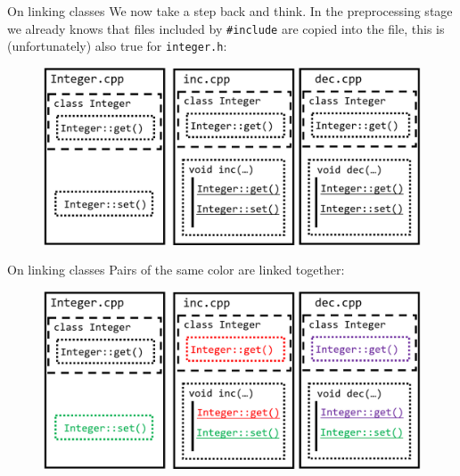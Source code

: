 \begin{frame}{On linking classes}
We now take a step back and think. In the preprocessing stage we already knows that files included by \texttt{\#include} are copied into the file, this is (unfortunately) also true for \texttt{integer.h}:

\vspace{-0.1in}
\begin{figure}
\centering
\includegraphics[scale=0.37]{fig/rc8link1}
\end{figure}

\end{frame}

\begin{frame}{On linking classes}
Pairs of the same color are linked together:
\begin{figure}
\centering
\includegraphics[scale=0.37]{fig/rc8link2}
\end{figure}
\end{frame}

